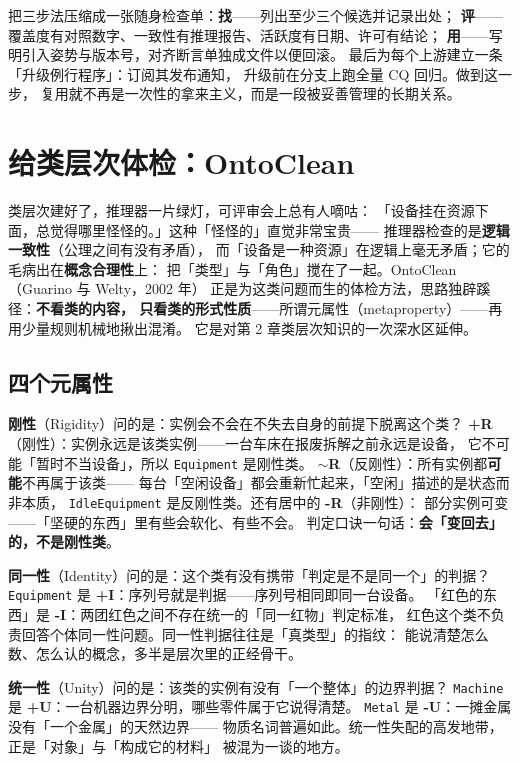 把三步法压缩成一张随身检查单：\textbf{找}——列出至少三个候选并记录出处；
\textbf{评}——覆盖度有对照数字、一致性有推理报告、活跃度有日期、许可有结论；
\textbf{用}——写明引入姿势与版本号，对齐断言单独成文件以便回滚。
最后为每个上游建立一条「升级例行程序」：订阅其发布通知，
升级前在分支上跑全量 CQ 回归。做到这一步，
复用就不再是一次性的拿来主义，而是一段被妥善管理的长期关系。

\section{给类层次体检：OntoClean}

类层次建好了，推理器一片绿灯，可评审会上总有人嘀咕：
「设备挂在资源下面，总觉得哪里怪怪的。」这种「怪怪的」直觉非常宝贵——
推理器检查的是\textbf{逻辑一致性}（公理之间有没有矛盾），
而「设备是一种资源」在逻辑上毫无矛盾；它的毛病出在\textbf{概念合理性}上：
把「类型」与「角色」搅在了一起。OntoClean（Guarino 与 Welty，2002 年）
正是为这类问题而生的体检方法，思路独辟蹊径：\textbf{不看类的内容，
只看类的形式性质}——所谓元属性（metaproperty）——再用少量规则机械地揪出混淆。
它是对第 2 章类层次知识的一次深水区延伸。

\subsection{四个元属性}

\textbf{刚性}（Rigidity）问的是：实例会不会在不失去自身的前提下脱离这个类？
\textbf{+R}（刚性）：实例永远是该类实例——一台车床在报废拆解之前永远是设备，
它不可能「暂时不当设备」，所以 \texttt{Equipment} 是刚性类。
\textbf{\(\sim\)R}（反刚性）：所有实例都\textbf{可能}不再属于该类——
每台「空闲设备」都会重新忙起来，「空闲」描述的是状态而非本质，
\texttt{IdleEquipment} 是反刚性类。还有居中的 \textbf{-R}（非刚性）：
部分实例可变——「坚硬的东西」里有些会软化、有些不会。
判定口诀一句话：\textbf{会「变回去」的，不是刚性类}。

\textbf{同一性}（Identity）问的是：这个类有没有携带「判定是不是同一个」的判据？
\texttt{Equipment} 是 \textbf{+I}：序列号就是判据——序列号相同即同一台设备。
「红色的东西」是 \textbf{-I}：两团红色之间不存在统一的「同一红物」判定标准，
红色这个类不负责回答个体同一性问题。同一性判据往往是「真类型」的指纹：
能说清楚怎么数、怎么认的概念，多半是层次里的正经骨干。

\textbf{统一性}（Unity）问的是：该类的实例有没有「一个整体」的边界判据？
\texttt{Machine} 是 \textbf{+U}：一台机器边界分明，哪些零件属于它说得清楚。
\texttt{Metal} 是 \textbf{-U}：一摊金属没有「一个金属」的天然边界——
物质名词普遍如此。统一性失配的高发地带，正是「对象」与「构成它的材料」
被混为一谈的地方。

